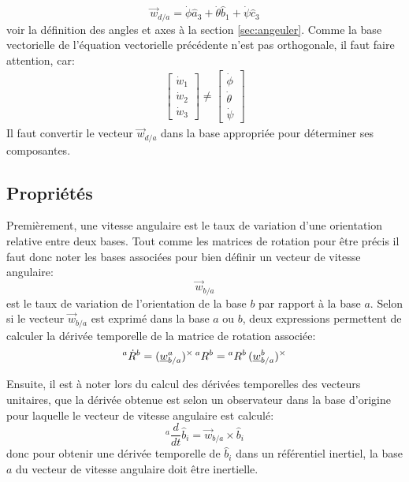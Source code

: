\begin{equation}
	\vec{w}_{d/a} = \dot{\phi} \hat{a}_3 + \dot{\theta} \hat{b}_1 + \dot{\psi} \hat{c}_3
\end{equation}
voir la définition des angles et axes à la section \ref{sec:angeuler}. Comme la base vectorielle de l'équation vectorielle précédente n'est pas orthogonale, il faut faire attention, car:
\begin{align}
	\left[ \begin{array}{c}
			   \dot{w}_1  \\
			   \dot{w}_2  \\
			   \dot{w}_3
	\end{array}  \right]  \neq
	\left[ \begin{array}{c}
			   \dot{\phi}  \\
			   \dot{\theta}   \\
			   \dot{\psi}
	\end{array}  \right]
\end{align}
Il faut convertir le vecteur $\vec{w}_{d/a}$ dans la base appropriée pour déterminer ses composantes.

\subsection{Propriétés}

Premièrement, une vitesse angulaire est le taux de variation d'une orientation relative entre deux bases. Tout comme les matrices de rotation pour être précis il faut donc noter les bases associées pour bien définir un vecteur de vitesse angulaire:
\begin{equation}
	\vec{w}_{b/a}
\end{equation}
est le taux de variation de l'orientation de la base $b$ par rapport à la base $a$. Selon si le vecteur $\vec{w}_{b/a}$ est exprimé dans la base $a$ ou $b$, deux expressions permettent de calculer la dérivée temporelle de la matrice de rotation associée:
\begin{equation}
{}^{a}\dot{R}^b =  (\underline{w}_{b/a}^a)^{\times} \, {}^{a}R^b =   {}^{a}R^b \, (\underline{w}_{b/a}^b)^{\times}
\end{equation}

Ensuite, il est à noter lors du calcul des dérivées temporelles des vecteurs unitaires, que la dérivée obtenue est selon un observateur dans la base d'origine pour laquelle le vecteur de vitesse angulaire est calculé:
\begin{equation}
{}^{a}\frac{d}{dt}\hat{b}_i = \vec{w}_{b/a} \times \hat{b}_i
\end{equation}
donc pour obtenir une dérivée temporelle de $\hat{b}_i$ dans un référentiel inertiel, la base $a$ du vecteur de vitesse angulaire doit être inertielle.

